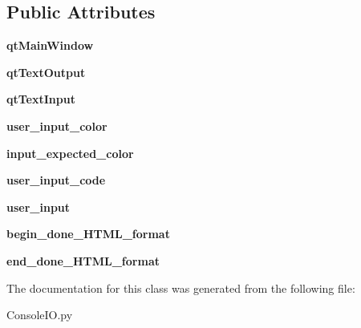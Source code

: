 \subsection*{Public Attributes}
\begin{DoxyCompactItemize}
\item 
\hypertarget{classConsoleIO_1_1ConsoleIO_ac086d918856a83d62a8e5cdb31a28f8d}{{\bfseries qt\-Main\-Window}}\label{classConsoleIO_1_1ConsoleIO_ac086d918856a83d62a8e5cdb31a28f8d}

\item 
\hypertarget{classConsoleIO_1_1ConsoleIO_a1324b4307ad09f691b1e573f0a154925}{{\bfseries qt\-Text\-Output}}\label{classConsoleIO_1_1ConsoleIO_a1324b4307ad09f691b1e573f0a154925}

\item 
\hypertarget{classConsoleIO_1_1ConsoleIO_a7c8112c8f65a6dc2a6f43b3db4534f5a}{{\bfseries qt\-Text\-Input}}\label{classConsoleIO_1_1ConsoleIO_a7c8112c8f65a6dc2a6f43b3db4534f5a}

\item 
\hypertarget{classConsoleIO_1_1ConsoleIO_a34f71a23157e269ffb8c10e413cf9880}{{\bfseries user\-\_\-input\-\_\-color}}\label{classConsoleIO_1_1ConsoleIO_a34f71a23157e269ffb8c10e413cf9880}

\item 
\hypertarget{classConsoleIO_1_1ConsoleIO_a1594f6721d11c7eec3501b377029804b}{{\bfseries input\-\_\-expected\-\_\-color}}\label{classConsoleIO_1_1ConsoleIO_a1594f6721d11c7eec3501b377029804b}

\item 
\hypertarget{classConsoleIO_1_1ConsoleIO_a6c3df50c1c124ce746f91c394b17443d}{{\bfseries user\-\_\-input\-\_\-code}}\label{classConsoleIO_1_1ConsoleIO_a6c3df50c1c124ce746f91c394b17443d}

\item 
\hypertarget{classConsoleIO_1_1ConsoleIO_a6762b0da0e96d3f035d921a21c8e66a3}{{\bfseries user\-\_\-input}}\label{classConsoleIO_1_1ConsoleIO_a6762b0da0e96d3f035d921a21c8e66a3}

\item 
\hypertarget{classConsoleIO_1_1ConsoleIO_a0516aefbc0f9539479bdcf445ba62a6f}{{\bfseries begin\-\_\-done\-\_\-\-H\-T\-M\-L\-\_\-format}}\label{classConsoleIO_1_1ConsoleIO_a0516aefbc0f9539479bdcf445ba62a6f}

\item 
\hypertarget{classConsoleIO_1_1ConsoleIO_a8f78ea5f064dbe664f5fe78fecccf31a}{{\bfseries end\-\_\-done\-\_\-\-H\-T\-M\-L\-\_\-format}}\label{classConsoleIO_1_1ConsoleIO_a8f78ea5f064dbe664f5fe78fecccf31a}

\end{DoxyCompactItemize}


The documentation for this class was generated from the following file\-:\begin{DoxyCompactItemize}
\item 
Console\-I\-O.\-py\end{DoxyCompactItemize}
